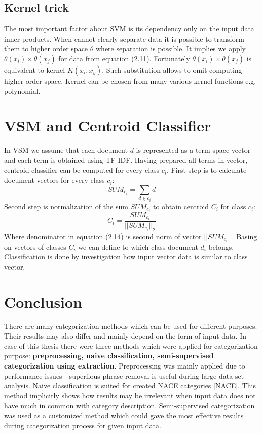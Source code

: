 \subsection{Kernel trick}
The most important factor about SVM is its dependency only on the input data inner products.\cite{6} When cannot clearly separate data it is possible to transform them to higher order space $\theta$ where separation is possible. It implies we apply $\theta(x_i) \times \theta(x_j)$ for data from equation (2.11). Fortunately $\theta(x_i) \times \theta(x_j)$ is equivalent to kernel $K(x_i,x_y)$. Such substitution allows to omit computing higher order space. Kernel can be chosen from many various kernel functions e.g. polynomial. \cite{svm_wiki}

\section{VSM and Centroid Classifier}
In VSM we assume that each document $d$ is represented as a term-space vector and each term is obtained using TF-IDF. Having prepared all terms in vector, centroid classifier can be computed for every class $c_i$\cite{8}.
\newline First step is to calculate document vectors for every class $c_i$:
\begin{equation}
SUM_{c_i} = \sum_{d\in c_i}d
\end{equation}
\newline Second step is normalization of the sum $SUM_{c_i}$ to obtain centroid $C_i$ for class $c_i$:
\begin{equation}
C_i = \frac{SUM_{c_i}}{||SUM_{c_i}||_2}
\end{equation}
Where denominator in equation (2.14) is second norm of vector $||SUM_{c_i}||$. Basing on vectors of classes $C_i$ we can define to which class document $d_i$ belongs. Classification is done by investigation how input vector data is similar to class vector. 

\section{Conclusion}
There are many categorization methods which can be used for different purposes. Their results may also differ and mainly depend on the form of input data. In case of this thesis there were three methods which were applied for categorization purpose: \textbf{preprocessing, naive classification, semi-supervised categorization using extraction}. Preprocessing was mainly applied due to performance issues - superflous phrase removal is useful during large data set analysis. Naive classification is suited for created NACE categories \ref{NACE}. This method implicitly shows how results may be irrelevant when input data does not have much in common with category description. Semi-supervised categorization was used as a customized method which could gave the most effective results during categorization process for given input data.    


